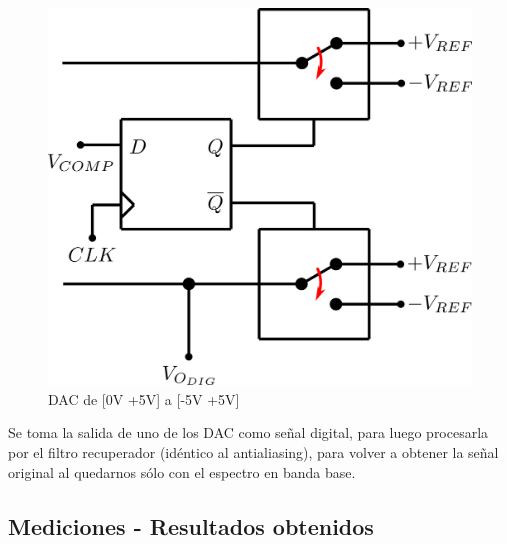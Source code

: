 \documentclass[assd_tp3_main.tex]{subfiles}
\begin{document}
\begin{figure}[!ht]
\begin{centering}
\includegraphics[scale=0.5]{images/ej5/DAC.png}
\par\end{centering}
\caption{DAC de [0V +5V] a [-5V +5V]}
\end{figure}

Se toma la salida de uno de los DAC como señal digital, para luego procesarla por el filtro recuperador (idéntico al antialiasing), para volver a obtener la señal original al quedarnos sólo con el espectro en banda base.

\subsection{Mediciones - Resultados obtenidos}

\end{document}
